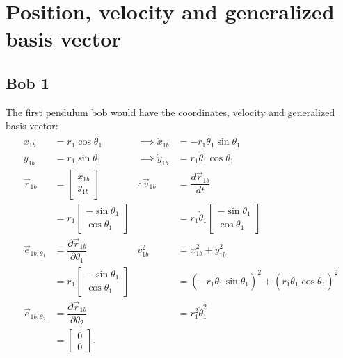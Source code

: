 \documentclass[12pt,a4paper,portrait]{article}
\begin{document}
	
	\section{Position, velocity and generalized basis vector}
	\subsection{Bob 1}
	The first pendulum bob would have the coordinates, velocity and generalized basis vector:
	\begin{align*}
		x_{1b} &= r_1 \cos{\theta_1} &\implies \dot{x}_{1b} &= -r_1\dot{\theta}_1 \sin{\theta_1}\\
		y_{1b} &= r_1 \sin{\theta_1} &\implies \dot{y}_{1b} &= r_1 \dot{\theta}_1 \cos{\theta_1} \\
		\vec{r}_{1b} &= \begin{bmatrix}
			x_{1b}\\
			y_{1b}
		\end{bmatrix}  &\therefore \vec{v}_{1b} &= \dfrac{d \vec{r}_{1b}}{dt}\\
		&= r_1\begin{bmatrix}
				-\sin{\theta_1} \\
				\cos{\theta_1}
			\end{bmatrix} & &=r_1\dot{\theta}_1 \begin{bmatrix}
			-\sin{\theta_1} \\
			\cos{\theta_1}
		\end{bmatrix} \\
		\vec{e}_{1b,\theta_1} &= \dfrac{\partial \vec{r}_{1b}}{\partial \theta_1}& v_{1b}^2 &= \dot{x}_{1b}^2 + \dot{y}_{1b}^2 \\
		&= r_1 \begin{bmatrix}
			-\sin{\theta_1}\\
			\cos{\theta_1}
		\end{bmatrix} & &= \left(-r_1\dot{\theta}_1 \sin{\theta_1}\right)^2 + \left(r_1 \dot{\theta}_1 \cos{\theta_1}\right)^2 \\
		\vec{e}_{1b,\theta_2} &= \dfrac{\partial \vec{r}_{1b}}{\partial \theta_2} &&= r_1^2 \dot{\theta}_1^2\\
		&= \begin{bmatrix}
			0\\
			0
		\end{bmatrix}.
	\end{align*}
	
\end{document}
